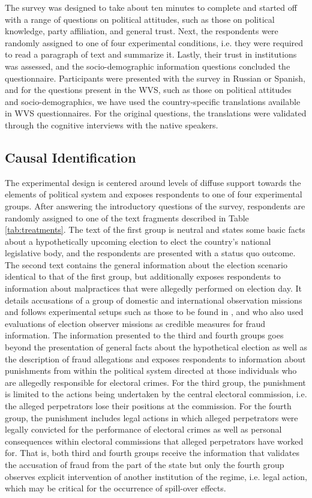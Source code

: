 \documentclass[11pt, ngerman,english,a4]{article}
\begin{document}
The survey was designed to take about ten minutes to complete and started off with a range of questions on political attitudes, such as those on political knowledge, party affiliation, and general trust. 
Next, the respondents were randomly assigned to one of four experimental conditions, i.e. they were required to read a paragraph of text and summarize it. 
Lastly, their trust in institutions was assessed, and the socio-demographic information questions concluded the questionnaire.
Participants were presented with the survey in Russian or Spanish, and for the questions present in the WVS, such as those on political attitudes and socio-demographics, we have used the country-specific translations available in WVS questionnaires. 
For the original questions, the translations were validated through the cognitive interviews with the native speakers. 


\subsection*{Causal Identification}

The experimental design is centered around levels of diffuse support towards the elements of political system and exposes respondents to one of four experimental groups. 
After answering the introductory questions of the survey, respondents are randomly assigned to one of the text fragments described in Table \ref{tab:treatments}. 
The text of the first group is neutral and states some basic facts about a hypothetically upcoming election to elect the country's national legislative body, and the respondents are presented with a status quo outcome. 
The second text contains the general information about the election scenario identical to that of the first group, but additionally exposes respondents to information about malpractices that were allegedly performed on election day.
It details accusations of a group of domestic and international observation missions and follows experimental setups such as those to be found in \citet{Bush2018}, \citet{Williamson2021} and \citet{Robertson2017} who also used evaluations of election observer missions as credible measures for fraud information. 
The information presented to the third and fourth groups goes beyond the presentation of general facts about the hypothetical election as well as the description of fraud allegations and exposes respondents to information about punishments from within the political system directed at those individuals who are allegedly responsible for electoral crimes. 
For the third group, the punishment is limited to the actions being undertaken by the central electoral commission, i.e. the alleged perpetrators lose their positions at the commission. 
For the fourth group, the punishment includes legal actions in which alleged perpetrators were legally convicted for the performance of electoral crimes as well as personal consequences within electoral commissions that alleged perpetrators have worked for. 
That is, both third and fourth groups receive the information that validates the accusation of fraud from the part of the state but only the fourth group observes explicit intervention of another institution of the regime, i.e. legal action, which may be critical for the occurrence of spill-over effects.  
\end{document}
